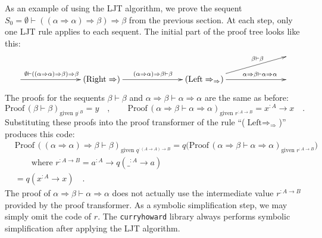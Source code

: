 As an example of using the LJT algorithm, we prove the sequent $S_{0}=\emptyset\vdash((\alpha\Rightarrow\alpha)\Rightarrow\beta)\Rightarrow\beta$
from the previous section. At each step, only one LJT rule applies
to each sequent. The initial part of the proof tree looks like this:\vspace{-1\baselineskip}
\[
\xymatrix{\xyScaleY{1.5pc}\xyScaleX{6pc} &  &  & ~\\
\ar[r]\sp(0.4){\emptyset\vdash((\alpha\Rightarrow\alpha)\Rightarrow\beta)\Rightarrow\beta} & (\text{Right}\Rightarrow)\ar[r]\sp(0.5){(\alpha\Rightarrow\alpha)\Rightarrow\beta\vdash\beta} & (\text{Left}\Rightarrow_{\Rightarrow})\ar[ru]\sp(0.65){\beta\vdash\beta}\ar[r]\sp(0.65){\alpha\Rightarrow\beta\vdash\alpha\Rightarrow\alpha} & ~
}
\]
The proofs for the sequents $\beta\vdash\beta$ and $\alpha\Rightarrow\beta\vdash\alpha\Rightarrow\alpha$
are the same as before:
\[
\text{Proof}\,(\beta\vdash\beta)_{\text{given }y^{:B}}=y\quad,\quad\quad\text{Proof}\,(\alpha\Rightarrow\beta\vdash\alpha\Rightarrow\alpha)_{\text{given }r^{:A\rightarrow B}}=x^{:A}\rightarrow x\quad.
\]
Substituting these proofs into the proof transformer of the rule \textsf{``}($\text{Left}\Rightarrow_{\Rightarrow}$)\textsf{''}
produces this code:
\begin{align*}
 & \text{Proof}\,((\alpha\Rightarrow\alpha)\Rightarrow\beta\vdash\beta)_{\text{given }q^{:(A\rightarrow A)\rightarrow B}}=q\big(\text{Proof}\,(\alpha\Rightarrow\beta\vdash\alpha\Rightarrow\alpha)_{\text{given }r^{:A\rightarrow B}}\big)\\
 & \quad\quad\text{where }r^{:A\rightarrow B}=a^{:A}\rightarrow q(\_^{:A}\rightarrow a)\\
 & =q(x^{:A}\rightarrow x)\quad.
\end{align*}
The proof of $\alpha\Rightarrow\beta\vdash\alpha\Rightarrow\alpha$
does not actually use the intermediate value $r^{:A\rightarrow B}$
provided by the proof transformer. As a symbolic simplification step,
we may simply omit the code of $r$. The \lstinline!curryhoward!
library always performs symbolic simplification after applying the
LJT algorithm. 

